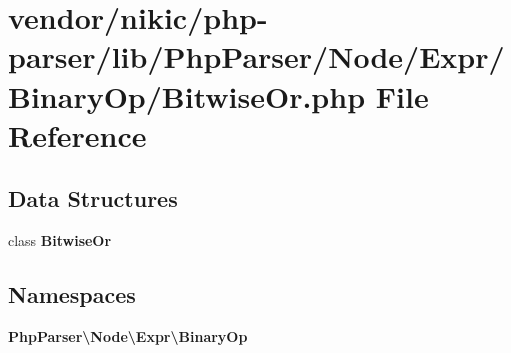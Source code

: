 \section{vendor/nikic/php-\/parser/lib/\+Php\+Parser/\+Node/\+Expr/\+Binary\+Op/\+Bitwise\+Or.php File Reference}
\label{_binary_op_2_bitwise_or_8php}
\subsection*{Data Structures}
\begin{DoxyCompactItemize}
\item 
class {\bf Bitwise\+Or}
\end{DoxyCompactItemize}
\subsection*{Namespaces}
\begin{DoxyCompactItemize}
\item 
 {\bf Php\+Parser\textbackslash{}\+Node\textbackslash{}\+Expr\textbackslash{}\+Binary\+Op}
\end{DoxyCompactItemize}
